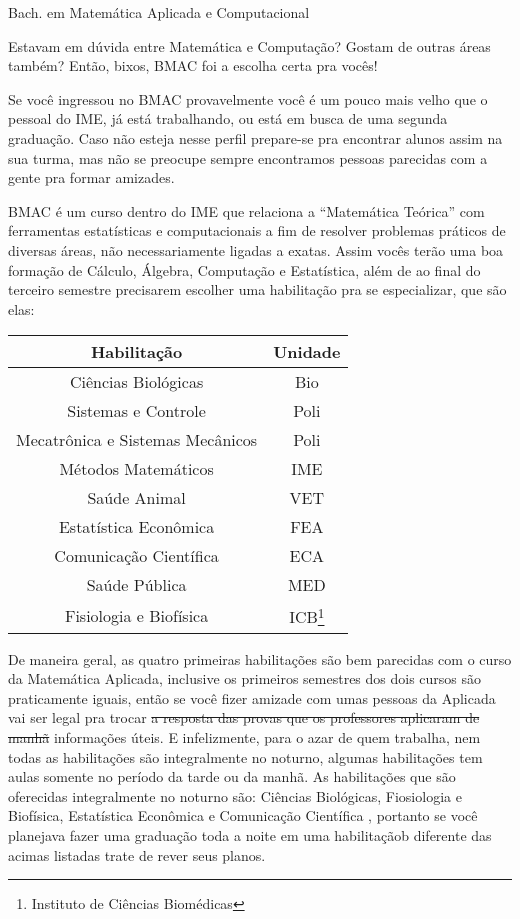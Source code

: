 \begin{subsecao}{Bach. em Matemática Aplicada e Computacional}

Estavam em dúvida entre Matemática e Computação? Gostam de outras áreas também?
Então, bixos, BMAC foi a escolha certa pra vocês!

Se você ingressou no BMAC provavelmente você é um pouco mais velho que o pessoal
do IME, já está trabalhando, ou está em busca de uma segunda graduação. Caso não
esteja nesse perfil prepare-se pra encontrar alunos assim na sua turma, mas não se
preocupe sempre encontramos pessoas parecidas com a gente pra formar amizades.

BMAC é um curso dentro do IME que relaciona a ``Matemática Teórica'' com
ferramentas estatísticas e computacionais a fim de resolver problemas práticos
de diversas áreas, não necessariamente ligadas a exatas. Assim vocês terão uma boa
formação de Cálculo, Álgebra, Computação e Estatística, além de ao final do terceiro
semestre precisarem escolher uma habilitação pra se especializar, que são elas:

\begin {center}
  \begin {tabular}{|c|c|}
    \hline
    Habilitação & Unidade \\
    \hline
    Ciências Biológicas & Bio\\
    Sistemas e Controle & Poli\\
    Mecatrônica e Sistemas Mecânicos & Poli\\
    Métodos Matemáticos & IME\\
    Saúde Animal & VET \\
    Estatística Econômica & FEA \\
    Comunicação Científica & ECA \\
    Saúde Pública & MED \\
    Fisiologia e Biofísica & ICB\footnote{Instituto de Ciências Biomédicas} \\
    \hline
  \end {tabular}
\end {center}

De maneira geral, as quatro primeiras habilitações são bem parecidas com o curso da Matemática
Aplicada, inclusive os primeiros semestres dos dois cursos são praticamente iguais,
então se você fizer amizade com umas pessoas da Aplicada vai ser legal pra trocar
\sout{a resposta das provas que os professores aplicaram de manhã} informações úteis.
E infelizmente, para o azar de quem trabalha, nem todas as habilitações são integralmente
no noturno, algumas habilitações tem aulas somente no período da tarde ou da manhã. As habilitações
que são oferecidas integralmente no noturno são: Ciências Biológicas, Fiosiologia e Biofísica, 
Estatística Econômica e Comunicação Científica , portanto se você planejava fazer uma graduação
toda a noite em uma habilitaçãob diferente das acimas listadas trate de rever seus planos.


\end{subsecao}
